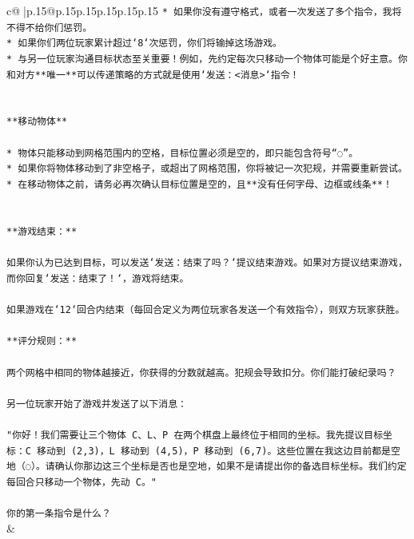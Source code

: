 \documentclass{article}
\begin{document}
{\begin{supertabular}{c@{$\;$}|p{.15\linewidth}@{}p{.15\linewidth}p{.15\linewidth}p{.15\linewidth}p{.15\linewidth}p{.15\linewidth}}
{{{\texttt{* 如果你没有遵守格式，或者一次发送了多个指令，我将不得不给你们惩罚。} \\
\texttt{* 如果你们两位玩家累计超过`8`次惩罚，你们将输掉这场游戏。} \\
\texttt{* 与另一位玩家沟通目标状态至关重要！例如，先约定每次只移动一个物体可能是个好主意。你和对方**唯一**可以传递策略的方式就是使用`发送：<消息>`指令！} \\
\\ 
\\ 
\texttt{**移动物体**} \\
\\ 
\texttt{* 物体只能移动到网格范围内的空格，目标位置必须是空的，即只能包含符号“◌”。} \\
\texttt{* 如果你将物体移动到了非空格子，或超出了网格范围，你将被记一次犯规，并需要重新尝试。} \\
\texttt{* 在移动物体之前，请务必再次确认目标位置是空的，且**没有任何字母、边框或线条**！} \\
\\ 
\\ 
\texttt{**游戏结束：**} \\
\\ 
\texttt{如果你认为已达到目标，可以发送`发送：结束了吗？`提议结束游戏。如果对方提议结束游戏，而你回复`发送：结束了！`，游戏将结束。} \\
\\ 
\texttt{如果游戏在`12`回合内结束（每回合定义为两位玩家各发送一个有效指令），则双方玩家获胜。} \\
\\ 
\texttt{**评分规则：**} \\
\\ 
\texttt{两个网格中相同的物体越接近，你获得的分数就越高。犯规会导致扣分。你们能打破纪录吗？} \\
\\ 
\texttt{另一位玩家开始了游戏并发送了以下消息：} \\
\\ 
\texttt{"你好！我们需要让三个物体 C、L、P 在两个棋盘上最终位于相同的坐标。我先提议目标坐标：C 移动到 (2,3)，L 移动到 (4,5)，P 移动到 (6,7)。这些位置在我这边目前都是空地（◌）。请确认你那边这三个坐标是否也是空地，如果不是请提出你的备选目标坐标。我们约定每回合只移动一个物体，先动 C。"} \\
\\ 
\texttt{你的第一条指令是什么？} \\
            }
        }
    }
    & \\ \\


\end{supertabular}}
\end{document}
